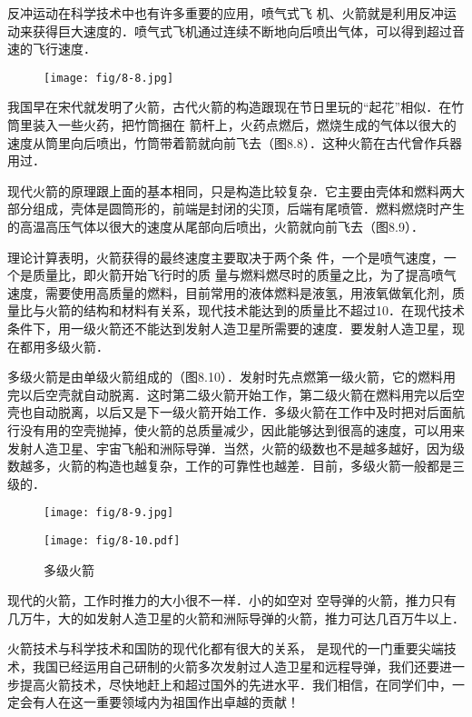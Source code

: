反冲运动在科学技术中也有许多重要的应用，喷气式飞
机、火箭就是利用反冲运动来获得巨大速度的．喷气式飞机通过连续不断地向后喷出气体，可以得到超过音速的飞行速度．
\begin{figure}[htp]\centering
\texttt{[image: fig/8-8.jpg]}
\caption{}
\end{figure}

我国早在宋代就发明了火箭，古代火箭的构造跟现在节日里玩的“起花”相似．在竹筒里装入一些火药，把竹筒捆在
箭杆上，火药点燃后，燃烧生成的气体以很大的速度从筒里向后喷出，竹筒带着箭就向前飞去（图8.8）．这种火箭在古代曾作兵器用过．

现代火箭的原理跟上面的基本相同，只是构造比较复杂．它主要由壳体和燃料两大部分组成，壳体是圆筒形的，前端是封闭的尖顶，后端有尾喷管．燃料燃烧时产生的高温高压气体以很大的速度从尾部向后喷出，火箭就向前飞去（图8.9）．

理论计算表明，火箭获得的最终速度主要取决于两个条
件，一个是喷气速度，一个是质量比，即火箭开始飞行时的质
量与燃料燃尽时的质量之比，为了提高喷气速度，需要使用高质量的燃料，目前常用的液体燃料是液氢，用液氧做氧化剂，质量比与火箭的结构和材料有关系，现代技术能达到的质量比不超过10．在现代技术条件下，用一级火箭还不能达到发射人造卫星所需要的速度．要发射人造卫星，现在都用多级火箭．

多级火箭是由单级火箭组成的（图8.10）．发射时先点燃第一级火箭，它的燃料用完以后空壳就自动脱离．这时第二级火箭开始工作，第二级火箭在燃料用完以后空壳也自动脱离，以后又是下一级火箭开始工作．多级火箭在工作中及时把对后面航行没有用的空壳抛掉，使火箭的总质量减少，因此能够达到很高的速度，可以用来发射人造卫星、宇宙飞船和洲际导弹．当然，火箭的级数也不是越多越好，因为级数越多，火箭的构造也越复杂，工作的可靠性也越差．目前，多级火箭一般都是三级的．

\begin{figure}[htp]
\centering
\begin{minipage}[t]{0.48\textwidth}
\centering
\texttt{[image: fig/8-9.jpg]}
\caption{}
\end{minipage}
\begin{minipage}[t]{0.48\textwidth}
\centering
\texttt{[image: fig/8-10.pdf]}
\caption{多级火箭}
\end{minipage}
\end{figure}


现代的火箭，工作时推力的大小很不一样．小的如空对
空导弹的火箭，推力只有几万牛，大的如发射人造卫星的火箭和洲际导弹的火箭，推力可达几百万牛以上．

火箭技术与科学技术和国防的现代化都有很大的关系，
是现代的一门重要尖端技术，我国已经运用自己研制的火箭多次发射过人造卫星和远程导弹，我们还要进一步提高火箭技术，尽快地赶上和超过国外的先进水平．我们相信，在同学们中，一定会有人在这一重要领域内为祖国作出卓越的贡献！


